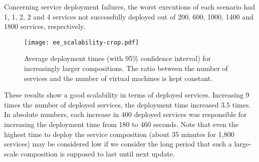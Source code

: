 Concerning service deployment failures,
the worst executions of each scenario had 1, 1, 2, 2 and 4 services not successfully deployed
out of 200, 600, 1000, 1400 and 1800 services, respectively.

\begin{figure}[h]
  \centering
  \texttt{[image: ee\_scalability-crop.pdf]}
  \caption{Average deployment times (with 95\% confidence interval) for increasingly larger compositions. The ratio between the number of services and the number of virtual machines is kept constant.}
  \label{fig:ee_scalability}
\end{figure}

These results show a good scalability in terms of deployed services.
Increasing 9 times the number of deployed services, the deployment time increased 3.5 times.
In absolute numbers, each increase in 400 deployed services 
was responsible for increasing the deployment time from 180 to 460 seconds. 
Note that even the highest time to deploy the service composition 
(about 35 minutes for 1,800 services) 
may be considered low if we consider the long period that 
such a large-scale composition is supposed to last until next update.

